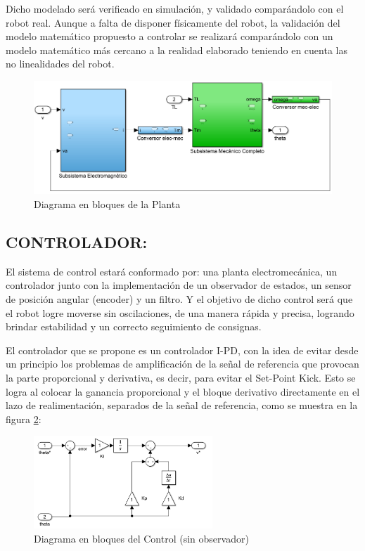 \documentclass{article}
\begin{document}
Dicho modelado será verificado en simulación, y validado comparándolo con el robot real. Aunque a falta de disponer físicamente del robot, la validación del modelo matemático propuesto a controlar se realizará comparándolo con un modelo matemático más cercano a la realidad elaborado teniendo en cuenta las no linealidades del robot.

\begin{figure}[H]
    \centering
    \includegraphics[width=1.1\textwidth]{Diagrama en bloques de la Planta}
    \caption{Diagrama en bloques de la Planta}
    \label{fig:Diagrama en bloques de la Planta}
\end{figure}


\subsection{CONTROLADOR:}
\label{sec:CONTROLADOR}

El sistema de control estará conformado por: una planta electromecánica, un controlador junto con la implementación de un observador de estados, un sensor de posición angular (encoder) y un filtro. Y el objetivo de dicho control será que el robot logre moverse sin oscilaciones, de una manera rápida y precisa, logrando brindar estabilidad y un correcto seguimiento de consignas.

El controlador que se propone es un controlador I-PD, con la idea de evitar desde un principio los problemas de amplificación de la señal de referencia que provocan la parte proporcional y derivativa, es decir, para evitar el Set-Point Kick. Esto se logra al colocar la ganancia proporcional y el bloque derivativo directamente en el lazo de realimentación, separados de la señal de referencia, como se muestra en la figura \ref{fig:Diagrama en bloques del Control (sin observador)}:

\begin{figure}[H]
    \centering
    \includegraphics[width=0.60\textwidth]{Diagrama en bloques del Control (sin observador)}
    \caption{Diagrama en bloques del Control (sin observador)}
    \label{fig:Diagrama en bloques del Control (sin observador)}
\end{figure}
\end{document}
